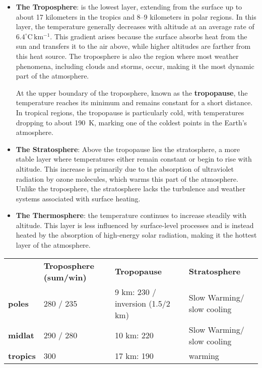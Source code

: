 \begin{itemize}
	\item \textbf{The Troposphere}: is the lowest layer, extending from the surface up to about 17 kilometers in the tropics and 8--9 kilometers in polar regions. In this layer, the temperature generally decreases with altitude at an average rate of $6.4^\circ \mathrm{C \, km^{-1}}$. This gradient arises because the surface absorbs heat from the sun and transfers it to the air above, while higher altitudes are farther from this heat source. The troposphere is also the region where most weather phenomena, including clouds and storms, occur, making it the most dynamic part of the atmosphere.

	      At the upper boundary of the troposphere, known as the \textbf{tropopause}, the temperature reaches its minimum and remains constant for a short distance. In tropical regions, the tropopause is particularly cold, with temperatures dropping to about 190~K, marking one of the coldest points in the Earth's atmosphere.

	\item \textbf{The Stratosphere}: Above the tropopause lies the stratosphere, a more stable layer where temperatures either remain constant or begin to rise with altitude. This increase is primarily due to the absorption of ultraviolet radiation by ozone molecules, which warms this part of the atmosphere. Unlike the troposphere, the stratosphere lacks the turbulence and weather systems associated with surface heating.

	\item \textbf{The Thermosphere}:  the temperature continues to increase steadily with altitude. This layer is less influenced by surface-level processes and is instead heated by the absorption of high-energy solar radiation, making it the hottest layer of the atmosphere.

\end{itemize}

\begin{table}[h]
	\begin{tabular}{llll}
		                                                             & {\color[HTML]{010066} \textbf{Troposphere (sum/win)}} & {\color[HTML]{010066} \textbf{Tropopause}} & {\color[HTML]{010066} \textbf{Stratosphere}} \\ \cline{2-4}
		\multicolumn{1}{l|}{{\color[HTML]{003532} \textbf{poles}}}   & 280 / 235                                             & 9 km: 230 / inversion (1.5/2 km)           & Slow Warming/ slow cooling                   \\
		\multicolumn{1}{l|}{{\color[HTML]{003532} \textbf{midlat}}}  & 290 / 280                                             & 10 km: 220                                 & Slow Warming/ slow cooling                   \\
		\multicolumn{1}{l|}{{\color[HTML]{003532} \textbf{tropics}}} & 300                                                   & 17 km: 190                                 & warming
	\end{tabular}
\end{table}

